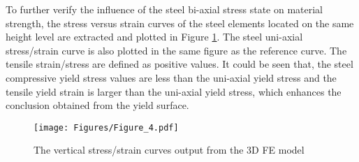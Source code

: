 \documentclass[12pt,a4]{article}
\begin{document}
	\par
	To further verify the influence of the steel bi-axial stress state on material strength, the stress versus strain curves of the steel elements located on the same height level are extracted and plotted in Figure \ref{fig-3}. The steel uni-axial stress/strain curve is also plotted in the same figure as the reference curve. The tensile strain/stress are defined as positive values. It could be seen that, the steel compressive yield stress values are less than the uni-axial yield stress and the tensile yield strain is larger than the uni-axial yield stress, which enhances the conclusion obtained from the yield surface.
	\par
	\begin{figure}[h]
		\centering
		\texttt{[image: Figures/Figure\_4.pdf]}
		\caption{The vertical stress/strain curves output from the 3D FE model}
		\label{fig-3}
	\end{figure}
	\par
\end{document}
